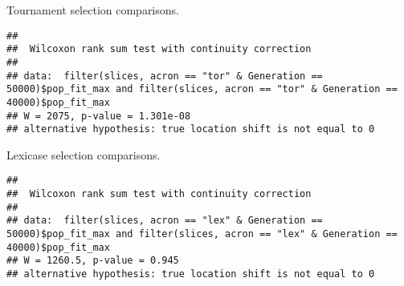 \documentclass[]{book}
\newenvironment{Shaded}{\begin{snugshade}}{\end{snugshade}}
\newcommand{\DataTypeTok}[1]{\textcolor[rgb]{0.13,0.29,0.53}{#1}}
\newcommand{\DecValTok}[1]{\textcolor[rgb]{0.00,0.00,0.81}{#1}}
\newcommand{\KeywordTok}[1]{\textcolor[rgb]{0.13,0.29,0.53}{\textbf{#1}}}
\newcommand{\NormalTok}[1]{#1}
\newcommand{\OperatorTok}[1]{\textcolor[rgb]{0.81,0.36,0.00}{\textbf{#1}}}
\newcommand{\StringTok}[1]{\textcolor[rgb]{0.31,0.60,0.02}{#1}}
\begin{document}
Tournament selection comparisons.

\begin{Shaded}
\end{Shaded}

\begin{verbatim}
## 
##  Wilcoxon rank sum test with continuity correction
## 
## data:  filter(slices, acron == "tor" & Generation == 50000)$pop_fit_max and filter(slices, acron == "tor" & Generation == 40000)$pop_fit_max
## W = 2075, p-value = 1.301e-08
## alternative hypothesis: true location shift is not equal to 0
\end{verbatim}

Lexicase selection comparisons.

\begin{Shaded}
\end{Shaded}

\begin{verbatim}
## 
##  Wilcoxon rank sum test with continuity correction
## 
## data:  filter(slices, acron == "lex" & Generation == 50000)$pop_fit_max and filter(slices, acron == "lex" & Generation == 40000)$pop_fit_max
## W = 1260.5, p-value = 0.945
## alternative hypothesis: true location shift is not equal to 0
\end{verbatim}
\end{document}
